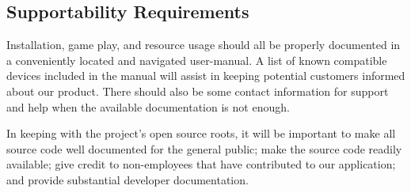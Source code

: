 \documentclass[12pt]{article}
\begin{document}
\subsection{Supportability Requirements}
Installation, game play, and resource usage should all be properly documented in a conveniently located and navigated user-manual. A list of known compatible devices included in the manual will assist in keeping potential customers informed about our product.  There should also be some contact information for support and help when the available documentation is not enough.

In keeping with the project's open source roots, it will be important to make all source code well documented for the general public; make the source code readily available; give credit to non-employees that have contributed to our application; and provide substantial developer documentation. 
\end{document}
